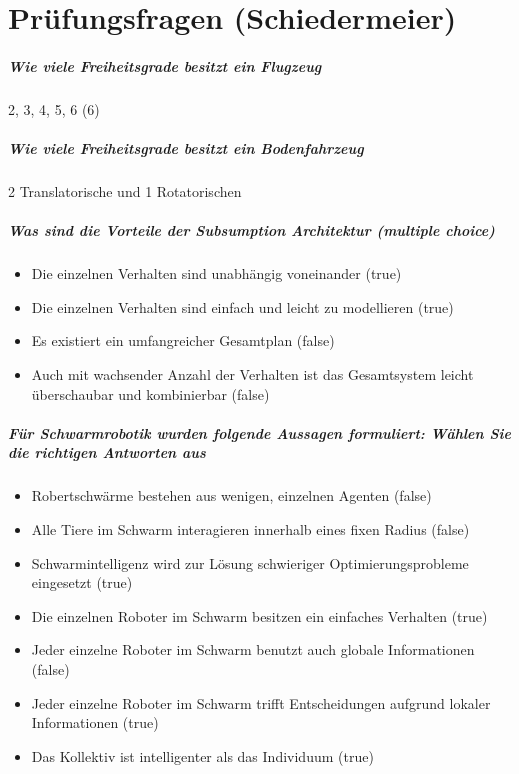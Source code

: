 \chapter{Prüfungsfragen (Schiedermeier)}
\paragraph{Wie viele Freiheitsgrade besitzt ein Flugzeug}
{2, 3, 4, 5, 6} (6)
\paragraph{Wie viele Freiheitsgrade besitzt ein Bodenfahrzeug}
2 Translatorische und 1 Rotatorischen
\paragraph{Was sind die Vorteile der Subsumption Architektur (multiple choice)}
\begin{itemize}
    \item Die einzelnen Verhalten sind unabhängig voneinander (true)
    \item Die einzelnen Verhalten sind einfach und leicht zu modellieren (true)
    \item Es existiert ein umfangreicher Gesamtplan (false)
	\item Auch mit wachsender Anzahl der Verhalten ist das Gesamtsystem leicht überschaubar und kombinierbar (false)
\end{itemize}
\paragraph{Für Schwarmrobotik wurden folgende Aussagen formuliert: Wählen Sie die richtigen Antworten aus}
\begin{itemize}
	\item Robertschwärme bestehen aus wenigen, einzelnen Agenten (false)
    \item Alle Tiere im Schwarm interagieren innerhalb eines fixen Radius (false)
    \item Schwarmintelligenz wird zur Lösung schwieriger Optimierungsprobleme eingesetzt (true)
    \item Die einzelnen Roboter im Schwarm besitzen ein einfaches Verhalten (true)
    \item Jeder einzelne Roboter im Schwarm benutzt auch globale Informationen (false)
    \item Jeder einzelne Roboter im Schwarm trifft Entscheidungen aufgrund lokaler Informationen (true)
    \item Das Kollektiv ist intelligenter als das Individuum (true)
\end{itemize}

